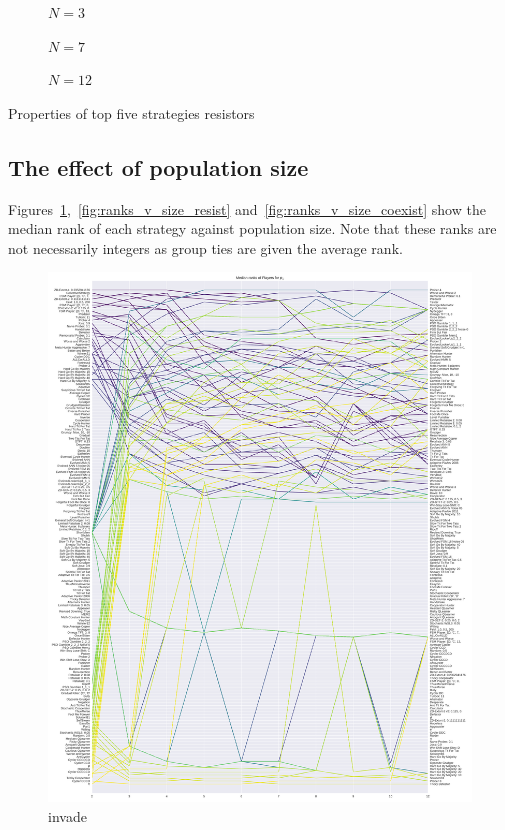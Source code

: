 \documentclass{article}
\begin{document}
\begin{table}[!hbtp]
    \begin{subfigure}[t]{\textwidth}
        \centering
        
        \caption{\(N=3\)}
    \end{subfigure}
    \begin{subfigure}[t]{\textwidth}
        \centering
        
        \caption{\(N=7\)}
    \end{subfigure}
    \begin{subfigure}[t]{\textwidth}
        \centering
        
        \caption{\(N=12\)}
    \end{subfigure}
    \caption{Properties of top five strategies resistors}
    \label{tbl:top_five_invade}
\end{table}

\subsection{The effect of population size}\label{sec:population_size}

Figures~\ref{fig:ranks_v_size_invade},~\ref{fig:ranks_v_size_resist}
and~\ref{fig:ranks_v_size_coexist} show the median rank of each strategy against
population size. Note that these ranks are
not necessarily integers as group ties are given the average rank.

\begin{figure}[!hbtp]
    \centering
    \includegraphics[height=.9\textheight]{./img/median_rank_vs_population_size_invade.pdf}
    \caption{invade}
    \label{fig:ranks_v_size_invade}
\end{figure}
\end{document}
